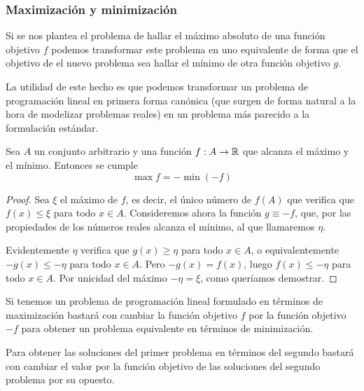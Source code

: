 \subsubsection{Maximización y minimización}
Si se nos plantea el problema de hallar el máximo absoluto de una función objetivo $f$ podemos transformar este problema en uno equivalente de forma que el objetivo de el nuevo problema sea hallar el mínimo de otra función objetivo $g$.

La utilidad de este hecho es que podemos transformar un problema de programación lineal en primera forma canónica (que surgen de forma natural a la hora de modelizar problemas reales) en un problema más parecido a la formulación estándar.
\begin{lem}
	Sea $A$ un conjunto arbitrario y una función $f:A\to\mathbb{R}$ que alcanza el máximo y el mínimo. Entonces se cumple
	\begin{equation*}
		\max f=-\min (-f)
	\end{equation*}
\end{lem}
\begin{proof}
	Sea $\xi$ el máximo de $f$, es decir, el único número de $f(A)$ que verifica que $f(x)\leq \xi$ para todo $x\in A$. Consideremos ahora la función $g\equiv -f$, que, por las propiedades de los números reales alcanza el mínimo, al que llamaremos $\eta$.
	
	Evidentemente $\eta$ verifica que $g(x)\geq \eta$ para todo $x\in A$, o equivalentemente $-g(x)\leq -\eta$ para todo $x\in A$. Pero $-g(x)=f(x)$, luego $f(x)\leq -\eta$ para todo $x\in A$. Por unicidad del máximo $-\eta =\xi$, como queríamos demostrar.
\end{proof}
\begin{obs}[Aplicación]
	Si tenemos un problema de programación lineal formulado en términos de maximización bastará con cambiar la función objetivo $f$ por la función objetivo $-f$ para obtener un problema equivalente en términos de minimización.
	
	Para obtener las soluciones del primer problema en términos del segundo bastará con cambiar el valor por la función objetivo de las soluciones del segundo problema por su opuesto.
\end{obs}
